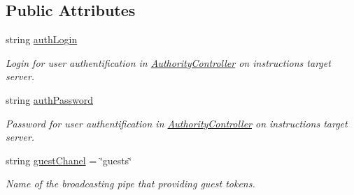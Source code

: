 \subsection*{Public Attributes}
\begin{DoxyCompactItemize}
\item 
string \mbox{\hyperlink{class_pipes_provider_1_1_networking_1_1_routing_1_1_authorized_instruction_aabef40719c548a28cd3517516be58ded}{auth\+Login}}
\begin{DoxyCompactList}\small\item\em Login for user authentification in \mbox{\hyperlink{namespace_authority_controller}{Authority\+Controller}} on instruction\textquotesingle{}s target server. \end{DoxyCompactList}\item 
string \mbox{\hyperlink{class_pipes_provider_1_1_networking_1_1_routing_1_1_authorized_instruction_aef611c3d3856d276dce814d7f4aaaee2}{auth\+Password}}
\begin{DoxyCompactList}\small\item\em Password for user authentification in \mbox{\hyperlink{namespace_authority_controller}{Authority\+Controller}} on instruction\textquotesingle{}s target server. \end{DoxyCompactList}\item 
string \mbox{\hyperlink{class_pipes_provider_1_1_networking_1_1_routing_1_1_authorized_instruction_a45172a0762b6627107f67e4e7db61780}{guest\+Chanel}} = \char`\"{}guests\char`\"{}
\begin{DoxyCompactList}\small\item\em Name of the broadcasting pipe that providing guest tokens. \end{DoxyCompactList}\end{DoxyCompactItemize}
